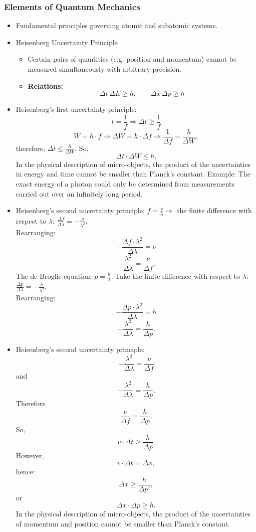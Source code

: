 \documentclass[t,aspectratio=169]{beamer}
\begin{document}
\begin{frame}
\frametitle{Elements of Quantum Mechanics}
\begin{itemize}
   \setlength{\parskip}{0pt}
\setlength{\itemsep}{0pt}
 \item Fundamental principles governing atomic and subatomic systems.
\item Heisenberg Uncertainty Principle
  \begin{itemize}
    \item Certain pairs of quantities (e.g. position and momentum) cannot be measured simultaneously with arbitrary precision.
    \item \textbf{Relations:} $$  \Delta t \, \Delta E \geq h, \qquad \Delta x \, \Delta p \geq h $$
   \end{itemize}
\pagebreak
\item Heisenberg’s first uncertainty principle: $$t=\frac{1}{f}\Rightarrow \Delta t \ge \frac{1}{f}$$ $$W=h\cdot f \Rightarrow \Delta W=h\cdot \Delta f \Rightarrow \frac{1}{\Delta f}=\frac{h}{\Delta W},$$ therefore, $\Delta t\le\frac{h}{\Delta W}$. So, $$\Delta t\cdot\Delta W \le h.$$
In the physical description of micro-objects, the product of the uncertainties in energy and time cannot be smaller than Planck’s constant.  
Example: The exact energy of a photon could only be determined from measurements carried out over an infinitely long period.
  \pagebreak
\item Heisenberg’s second uncertainty principle: $f=\frac{\nu}{\lambda}\Rightarrow$ the finite difference with respect to $\lambda$: $\frac{\Delta f}{\Delta \lambda}=-\frac{\nu}{\lambda^{2}}.$\\
Rearranging: $$-\frac{\Delta f\cdot\lambda^{2}}{\Delta\lambda}=\nu$$ $$-\frac{\lambda^{2}}{\Delta\lambda}=\frac{\nu}{\Delta f}.$$
The de Broglie equation: $p = \frac{h}{\lambda}$.
Take the finite difference with respect to $\lambda$: $\frac{\Delta p}{\Delta\lambda}=-\frac{h}{\lambda^{2}}$.\\
Rearranging:
$$-\frac{\Delta p\cdot\lambda^{2}}{\Delta\lambda}=h$$
\pagebreak
$$-\frac{\lambda^{2}}{\Delta\lambda}=\frac{h}{\Delta p}.$$
\item Heisenberg’s second uncertainty principle: $$-\frac{\lambda^{2}}{\Delta\lambda}=\frac{\nu}{\Delta f}$$ and $$-\frac{\lambda^{2}}{\Delta\lambda}=\frac{h}{\Delta p}.$$
  Therefore $$\frac{\nu}{\Delta f}=\frac{h}{\Delta p}.$$
  \pagebreak
  So, $$v\cdot\Delta t\ge\frac{h}{\Delta p}.$$
  However, $$v\cdot\Delta t=\Delta x,$$ hence: $$\Delta x\ge\frac{h}{\Delta p'},$$ or $$\Delta x\cdot\Delta p \ge h.$$
  In the physical description of micro-objects, the product of the uncertainties of momentum and position cannot be smaller than Planck’s constant.\\


\end{itemize}
\end{frame}
\end{document}
